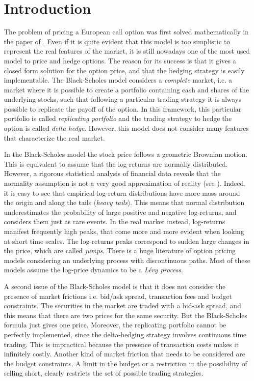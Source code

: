 

\chapter{Introduction}\label{Introd}
\minitoc%


\vspace{5em}

The problem of pricing a European call option was first solved mathematically in the paper of \cite{BS73}. 
Even if it is quite evident that this model is too simplistic to represent the real features of the market, it is 
still nowadays one of the most used model to price and hedge options.
The reason for its success is that it gives a closed form solution for the option price, and that the hedging strategy is easily 
implementable.
The Black-Scholes model considers a \emph{complete} market, i.e. a market where it is possible to create a portfolio containing cash 
and shares of the underlying stocks, such that following a particular trading strategy it is always possible to replicate
the payoff of the option. In this framework, this particular portfolio is called \emph{replicating portfolio} and
the trading strategy to hedge the option is called \emph{delta hedge}.
However, this model does not consider many features that characterize the real market. 

In the Black-Scholes model 
the stock price follows a geometric Brownian motion. This is equivalent to assume that the log-returns are 
normally distributed. 
However, a rigorous statistical analysis of financial data
reveals that the normality assumption is not a very good approximation of
reality (see \cite{Cont01}). Indeed, it is easy to see that empirical log-return distributions have
more mass around the origin and along the tails (\emph{heavy tails}).
This means that normal distribution underestimates the probability of large positive and negative
log-returns, and considers them just as rare events. In the real market instead,
log-returns manifest frequently high peaks, that come more and more evident
when looking at short time scales. The log-returns peaks correspond to sudden
large changes in the price, which are called \emph{jumps}. 
There is a huge literature of option pricing models considering an underlying process with discontinuous paths.
Most of these models assume the log-price dynamics to be a \emph{Lévy process}. 
 

A second issue of the Black-Scholes model is that it does not consider the presence of market frictions i.e.
bid/ask spread, transaction fees and budget constraints.
The securities in the market are traded with a bid-ask spread, and this means that there are two prices for the
same security. But the Black-Scholes formula just gives one price.
Moreover, the replicating portfolio cannot be perfectly implemented,
since the delta-hedging strategy involves continuous time trading. 
This is impractical because the presence of transaction costs makes it infinitely costly.
Another kind of market friction that needs to be considered are the budget constraints. 
A limit in the budget or a restriction in the possibility of 
selling short, clearly restricts the set of possible trading strategies.

